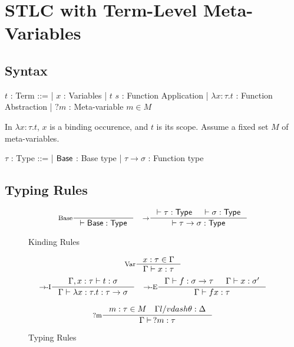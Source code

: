 \section{STLC with Term-Level Meta-Variables}

\subsection{Syntax}
\begin{bnf}
$t$ : \textsf{Term} ::=
| $x$ : Variables
| $t$ $s$ : Function Application
| $\lambda x \colon \tau. t$ : Function Abstraction
| $?m$ : Meta-variable $m \in M$
\end{bnf}

\hfill\break
In $\lambda x \colon \tau. t$, $x$ is a binding occurence, and $t$ is its scope.
Assume a fixed set $M$ of meta-variables.
\hfill\break

\noindent
\begin{bnf}
$\tau$ : \textsf{Type} ::=
| $\mathsf{Base}$ : Base type
| $\tau \to \sigma$ : Function type
\end{bnf}

\hfill\break


\subsection{Typing Rules}
\begin{figure*}[h]
   \[
    \inference[Base]{}
                    {\vdash \Base : \Type}
    \quad
    \inference[$\to$]{\vdash \tau : \Type & \vdash \sigma : \Type}
                     {\vdash \tau \to \sigma : \Type}
  \]
  \caption*{Kinding Rules}
  \label{fig:term-mvar-stlc-kinding}
\end{figure*}


\begin{figure*}[h]
  \[
    \inference[Var]{x : \tau \in \Gamma}
                   {\Gamma \vdash x : \tau}
  \]
  \[
    \inference[\Intro{$\to$}]{\Gamma, x : \tau \vdash t : \sigma}
                             {\Gamma \vdash \lambda x : \tau. t : \tau \to \sigma}
    \quad
    \inference[\Elim{$\to$}]{\Gamma \vdash f : \sigma \to \tau & \Gamma \vdash x : \sigma'}
                            {\Gamma \vdash f x : \tau}
  \]

  \[
  \inference[?m]
            {m : \tau \in M \quad \Gamma l/vdash \theta : \Delta}
            {\Gamma \vdash \,?m : \tau}
  \]

  \caption*{Typing Rules}
  \label{fig:term-mvar-stlc-typing}
\end{figure*}

